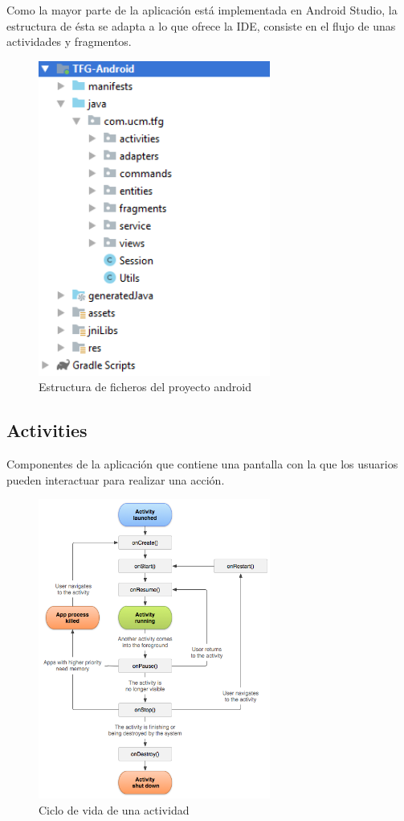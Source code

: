 Como la mayor parte de la aplicación está implementada en Android Studio, la estructura de ésta se adapta a lo que ofrece la IDE, consiste en el flujo de unas actividades y fragmentos.

\begin{figure}[H]
    \centering
    \includegraphics[width=3in]{figures/chapter-4/android_project_structure.png}
    \caption{Estructura de ficheros del proyecto android}
\end{figure}

\subsection{Activities}
\label{makereference4.3.1}
Componentes de la aplicación que contiene una pantalla con la que los usuarios pueden interactuar para realizar una acción.

\begin{figure}[H]
    \centering
    \includegraphics[width=3in]{figures/chapter-4/activity_lifecycle.png}
    \caption{Ciclo de vida de una actividad}
\end{figure}

